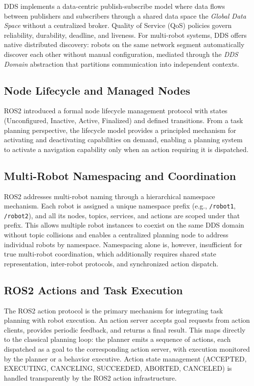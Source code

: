 \documentclass[12pt,a4paper]{article}
\theoremstyle{definition}
\theoremstyle{plain}
\begin{document}
DDS implements a data-centric publish-subscribe model where data flows between publishers and
subscribers through a shared data space the \textit{Global Data Space} without a centralized
broker. Quality of Service (QoS) policies govern reliability, durability, deadline, and liveness.
For multi-robot systems, DDS offers native distributed discovery: robots on the same network
segment automatically discover each other without manual configuration, mediated through the
\textit{DDS Domain} abstraction that partitions communication into independent contexts.

\subsection{Node Lifecycle and Managed Nodes}

ROS2 introduced a formal node lifecycle management protocol with states (Unconfigured, Inactive,
Active, Finalized) and defined transitions. From a task planning perspective, the lifecycle model
provides a principled mechanism for activating and deactivating capabilities on demand, enabling a
planning system to activate a navigation capability only when an action requiring it is dispatched.

\subsection{Multi-Robot Namespacing and Coordination}

ROS2 addresses multi-robot naming through a hierarchical namespace mechanism. Each robot is
assigned a unique namespace prefix (e.g., \texttt{/robot1}, \texttt{/robot2}), and all its nodes,
topics, services, and actions are scoped under that prefix. This allows multiple robot instances to
coexist on the same DDS domain without topic collisions and enables a centralized planning node to
address individual robots by namespace. Namespacing alone is, however, insufficient for true
multi-robot coordination, which additionally requires shared state representation, inter-robot
protocols, and synchronized action dispatch.

\subsection{ROS2 Actions and Task Execution}

The ROS2 action protocol is the primary mechanism for integrating task planning with robot
execution. An action server accepts goal requests from action clients, provides periodic feedback,
and returns a final result. This maps directly to the classical planning loop: the planner emits
a sequence of actions, each dispatched as a goal to the corresponding action server, with
execution monitored by the planner or a behavior executive. Action state management
(ACCEPTED, EXECUTING, CANCELING, SUCCEEDED, ABORTED, CANCELED) is handled transparently by
the ROS2 action infrastructure.
\end{document}
